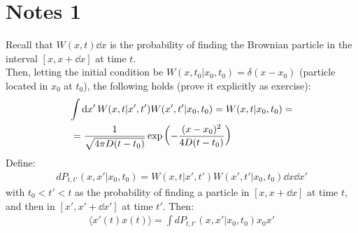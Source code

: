 \documentclass[../template.tex]{subfiles}
\begin{document}
\section{Notes 1}
Recall that $W(x,t)\dd{x}$ is the probability of finding the Brownian particle in the interval $[x,x+\dd{x}]$ at time $t$.\\
Then, letting the initial condition be $W(x,t_0 | x_0, t_0) = \delta(x- x_0)$ (particle located in $x_0$ at $t_0$), the following holds (prove it explicitly as exercise):
\begin{align*}
    \int \dd{x'} W(x,t|x',t') W(x',t'|x_0, t_0) = W(x,t|x_0, t_0) = \span \\
    &= \frac{1}{\sqrt{4 \pi D(t-t_0 ) }} \exp\left(-\frac{(x-x_0 )^2}{4D(t-t_0 )} \right) 
\end{align*}
Define:
\begin{align*}
    dP_{t,t'}(x,x'|x_0,t_0) = W(x,t|x',t') W(x',t'|x_0,t_0) \dd{x}\dd{x'}    
\end{align*}
with $t_0 < t' < t$ as the probability of finding a particle in $[x,x+\dd{x}]$ at time $t$, and then in $[x', x'+\dd{x'}]$ at time $t'$. Then:
\begin{align*}
    \langle x'(t) x(t) \rangle = \int dP_{t,t'}(x,x'|x_0, t_0) x_0 x'
\end{align*}    
\end{document}
